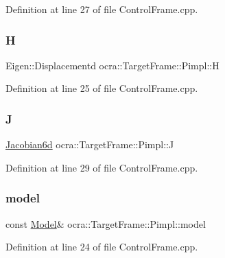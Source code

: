 Definition at line 27 of file Control\+Frame.\+cpp.

\hypertarget{structocra_1_1TargetFrame_1_1Pimpl_a84a376863b43fa29115be56fa326d8df}{}\label{structocra_1_1TargetFrame_1_1Pimpl_a84a376863b43fa29115be56fa326d8df} 
\subsubsection{\texorpdfstring{H}{H}}
{\footnotesize\ttfamily Eigen\+::\+Displacementd ocra\+::\+Target\+Frame\+::\+Pimpl\+::H}



Definition at line 25 of file Control\+Frame.\+cpp.

\hypertarget{structocra_1_1TargetFrame_1_1Pimpl_afc2a059aca6dc89c5da22b1b86b36922}{}\label{structocra_1_1TargetFrame_1_1Pimpl_afc2a059aca6dc89c5da22b1b86b36922} 
\subsubsection{\texorpdfstring{J}{J}}
{\footnotesize\ttfamily \hyperlink{namespaceocra_ac73b015f9f7cb0c252c4d5c4800f559a}{Jacobian6d} ocra\+::\+Target\+Frame\+::\+Pimpl\+::J}



Definition at line 29 of file Control\+Frame.\+cpp.

\hypertarget{structocra_1_1TargetFrame_1_1Pimpl_a7edc0b09f919bb223a44001cdba8dc84}{}\label{structocra_1_1TargetFrame_1_1Pimpl_a7edc0b09f919bb223a44001cdba8dc84} 
\subsubsection{\texorpdfstring{model}{model}}
{\footnotesize\ttfamily const \hyperlink{classocra_1_1Model}{Model}\& ocra\+::\+Target\+Frame\+::\+Pimpl\+::model}



Definition at line 24 of file Control\+Frame.\+cpp.

\hypertarget{structocra_1_1TargetFrame_1_1Pimpl_aecb4d2e7692ee0ff9298e8802756e098}{}\label{structocra_1_1TargetFrame_1_1Pimpl_aecb4d2e7692ee0ff9298e8802756e098} 
